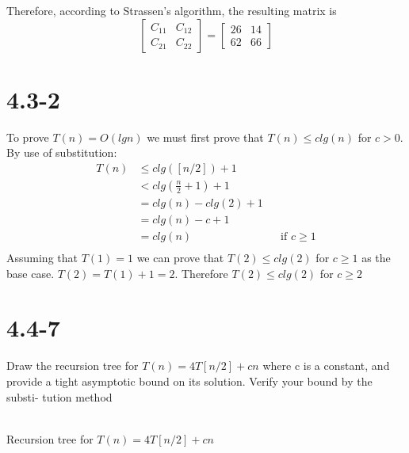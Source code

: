 \documentclass{article}
\begin{document}
{Therefore, according to Strassen's algorithm, the resulting matrix is
\[
\begin{bmatrix}
  C_{11} & C_{12} \\
  C_{21} & C_{22}
\end{bmatrix}
=
\begin{bmatrix}
  26 & 14 \\
  62 & 66
\end{bmatrix}
\]
\section{4.3-2}
To prove $T(n) = O(lgn)$ we must first prove that $T(n) \leq clg(n)$ for $c > 0$.
By use of substitution: \\
\begin{align*}
  T(n) &\leq clg([n/2]) + 1 \\
       &< clg(\frac{n}{2} + 1) + 1 \\
       &= clg(n) - clg(2) + 1 \\
       &= clg(n) - c + 1 \\
       &= clg(n) && \text{if $c \geq 1$} \\
\end{align*}
Assuming that $T(1) = 1$ we can prove that $T(2) \leq clg(2)$ for $c \geq 1$ as the base case.
$T(2) = T(1) + 1 = 2$. Therefore $T(2) \leq clg(2)$ for $c \geq 2$

\section{4.4-7}
Draw the recursion tree for $T(n) = 4T[n/2]  + cn$ where c is a constant, and
provide a tight asymptotic bound on its solution. Verify your bound by the substi-
tution method \\ \\

\begin{centering}
Recursion tree for $T(n) = 4T[n/2]  + cn$ \\
\end{centering}
\resizebox{0.9\textwidth}{!}{
\Tree [.$cn$ [.$c(n/2)$ $T(n/4)$ $T(n/4)$ $T(n/4)$ $T(n/4)$ ] [.$c(n/2)$ $T(n/4)$ $T(n/4)$ $T(n/4)$ $T(n/4)$ ] [.$c(n/2)$ $T(n/4)$ $T(n/4)$ $T(n/4)$ $T(n/4)$ ] [.$c(n/2)$ $T(n/4)$ $T(n/4)$ $T(n/4)$ $T(n/4)$ ] ]
} \\ \\

}
\end{document}
